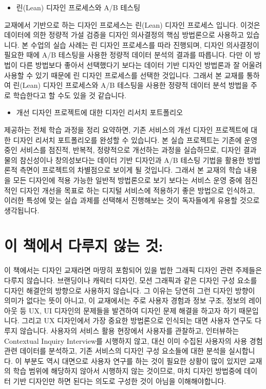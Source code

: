 \documentclass[
  letterpaper,
]{book}
\providecommand{\tightlist}{%
  \setlength{\itemsep}{0pt}\setlength{\parskip}{0pt}}\usepackage{longtable,booktabs,array}
\begin{document}
\begin{itemize}
\tightlist
\item
  린(Lean) 디자인 프로세스와 A/B 테스팅
\end{itemize}

교재에서 기반으로 하는 디자인 프로세스는 린(Lean) 디자인 프로세스
입니다. 이것은 데이터에 의한 정량적 가설 검증을 디자인 의사결정의 핵심
방법론으로 사용하고 있습니다. 본 수업의 실습 사례는 린 디자인 프로세스를
따라 진행되며, 디자인 의사결정이 필요한 때에 A/B 테스팅을 사용한 정량적
데이터 분석의 결과를 따릅니다. 다만 이 방법이 다른 방법보다 좋아서
선택했다기 보다는 데이터 기반 디자인 방법론과 잘 어울려 사용할 수 있기
때문에 린 디자인 프로세스를 선택한 것입니다. 그래서 본 교재를 통하여
린(Lean) 디자인 프로세스와 A/B 테스팅을 사용한 정량적 데이터 분석 방법을
주로 학습한다고 할 수도 있을 것 같습니다.

\begin{itemize}
\tightlist
\item
  개선 디자인 프로젝트에 대한 디자인 리서치 포트폴리오
\end{itemize}

제공하는 전체 학습 과정을 정리 요약하면, 기존 서비스의 개선 디자인
프로젝트에 대한 디자인 리서치 포트폴리오를 완성할 수 있습니다. 본 실습
프로젝트는 기존에 운영 중인 서비스를 점진적, 반복적, 정량적으로 개선하는
과정을 실습하므로, 디자인 결과물의 참신성이나 창의성보다는 데이터 기반
디자인과 A/B 테스팅 기법을 활용한 방법론적 측면이 프로젝트의 차별점으로
보이게 될 것입니다. 그래서 본 교재의 학습 내용을 모든 디자인에 적용
가능한 일반적 방법론으로 보기 보다는 서비스 운영 중에 점진적인 디자인
개선을 목표로 하는 디지털 서비스에 적용하기 좋은 방법으로 인식하고,
이러한 특성에 맞는 실습 과제를 선택해서 진행해보는 것이 독자들에게
유용할 것으로 생각됩니다.

\section{이 책에서 다루지 않는
것:}\label{uxc774-uxcc45uxc5d0uxc11c-uxb2e4uxb8e8uxc9c0-uxc54auxb294-uxac83}

이 책에서는 디자인 교재라면 마땅히 포함되어 있을 법한 그래픽 디자인 관련
주제들은 다루지 않습니다. 브랜딩이나 캐릭터 디자인, 모션 그래픽과 같은
디자인 구성 요소를 디자인 해결안의 방향으로 사용하지 않습니다. 그 이유는
당연히 그런 디자인 방향이 의미가 없다는 뜻이 아니고, 이 교재에서는 주로
사용자 경험과 정보 구조, 정보의 레이아웃 등 UX, UI 디자인의 문제들을
발견하여 디자인 문제 해결을 하고자 하기 때문입니다. 그리고 UX 디자인에서
가장 중요한 방법론으로 인식되는 대면 사용자 연구도 다루지 않습니다.
사용자의 서비스 활용 현장에서 사용자를 관찰하고, 인터뷰하는 Contextual
Inquiry Interview를 시행하지 않고, 대신 이미 수집된 사용자의 사용 경험
관련 데이터를 분석하고, 기존 서비스의 디자인 구성 요소들에 대한 분석을
실시합니다. 이 부분도 역시 대면으로 사용자 연구를 하는 것이 필요한
상황이 많이 있지만 교재의 학습 범위에 해당하지 않아서 시행하지 않는
것이므로, 마치 디자인 방법중에 데이터 기반 디자인만 하면 된다는 의도로
구성한 것이 아님을 이해해야합니다.
\end{document}
